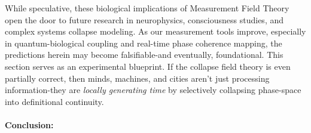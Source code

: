 While speculative, these biological implications of Measurement Field Theory open the door to future research in neurophysics, consciousness studies, and complex systems collapse modeling. \cite{chapter_time} As our measurement tools improve, especially in quantum-biological coupling and real-time phase coherence mapping, the predictions herein may become falsifiable-and eventually, foundational. \cite{chapter_time} This section serves as an experimental blueprint. If the collapse field theory is even partially correct, then minds, machines, and cities aren't just processing information-they are \textit{locally generating time} by selectively collapsing phase-space into definitional continuity. \cite{chapter_time} \paragraph{Conclusion:}

